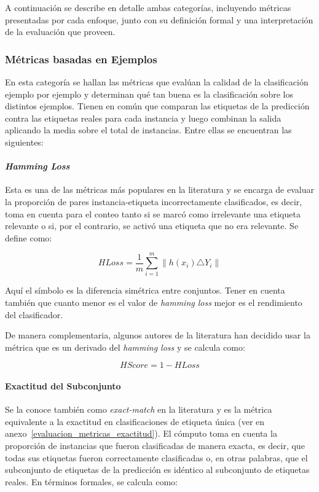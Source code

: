 A continuación se describe en detalle ambas categorías, incluyendo métricas
presentadas por cada enfoque, junto con su definición formal y una
interpretación de la evaluación que proveen.

\subsubsection{Métricas basadas en Ejemplos}

En esta categoría se hallan las métricas que evalúan la calidad de la
clasificación ejemplo por ejemplo y determinan qué tan buena es la clasificación
sobre los distintos ejemplos. Tienen en común que comparan las etiquetas de la
predicción contra las etiquetas reales para cada instancia y luego combinan la
salida aplicando la media sobre el total de instancias. Entre ellas se
encuentran las siguientes:

\paragraph{\textit{Hamming Loss}}

Esta es una de las métricas más populares en la literatura y se encarga de
evaluar la proporción de pares instancia-etiqueta incorrectamente clasificados,
es decir, toma en cuenta para el conteo tanto si se marcó como irrelevante una
etiqueta relevante o si, por el contrario, se activó una etiqueta que no era
relevante. Se define como:

\begin{equation}
	HLoss = \frac{1}{m} \sum_{i=1}^{m} \left\|h(x_{i}) \triangle Y_{i}\right\|
\end{equation}

Aquí el símbolo \comillas{$\triangle$} es la diferencia simétrica entre
conjuntos. Tener en cuenta también que cuanto menor es el valor de
\textit{hamming loss} mejor es el rendimiento del clasificador.

De manera complementaria, algunos autores de la literatura han decidido usar la
métrica  que es un derivado del \textit{hamming
	loss} y se calcula como:

\begin{equation}
	HScore = 1 - HLoss
\end{equation}

\paragraph{Exactitud del Subconjunto} Se la conoce también como
\textit{exact-match} en la literatura y es la métrica equivalente a la exactitud
en clasificaciones de etiqueta única (ver  en
anexo~\ref{evaluacion_metricas_exactitud}). El cómputo toma en cuenta la
proporción de instancias que fueron clasificadas de manera exacta, es decir, que
todas sus etiquetas fueron correctamente clasificadas o, en otras palabras, que
el subconjunto de etiquetas de la predicción es idéntico al subconjunto de
etiquetas reales. En términos formales, se calcula como:

